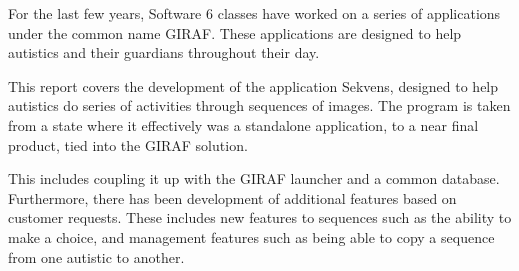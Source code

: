 For the last few years, Software 6 classes have worked on a series of applications under the common name GIRAF. These applications are designed to help autistics and their guardians throughout their day.

 This report covers the development of the application Sekvens, designed to help autistics do series of activities through sequences of images. The program is taken from a state where it effectively was a standalone application, to a near final product, tied into the GIRAF solution.
 
 This includes coupling it up with the GIRAF launcher and a common database. Furthermore, there has been development of additional features based on customer requests. These includes new features to sequences such as the ability to make a choice, and management features such as being able to copy a sequence from one autistic to another.
